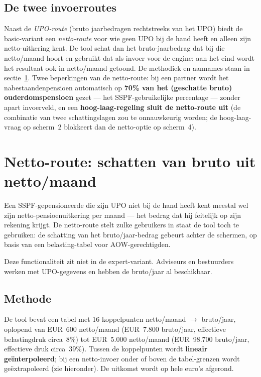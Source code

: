 \documentclass[11pt,a4paper]{article}
\begin{document}
\subsection{De twee invoerroutes}

Naast de \emph{UPO-route} (bruto jaarbedragen rechtstreeks van het UPO) biedt de basic-variant een \emph{netto-route} voor wie geen UPO bij de hand heeft en alleen zijn netto-uitkering kent. De tool schat dan het bruto-jaarbedrag dat bij die netto/maand hoort en gebruikt dat als invoer voor de engine; aan het eind wordt het resultaat ook in netto/maand getoond. De methodiek en aannames staan in sectie~\ref{sec:netto-route}. Twee beperkingen van de netto-route: bij een partner wordt het nabestaandenpensioen automatisch op \textbf{70\% van het (geschatte bruto) ouderdomspensioen} gezet --- het SSPF-gebruikelijke percentage --- zonder apart invoerveld, en een \textbf{hoog-laag-regeling sluit de netto-route uit} (de combinatie van twee schattingslagen zou te onnauwkeurig worden; de hoog-laag-vraag op scherm~2 blokkeert dan de netto-optie op scherm~4).

\section{Netto-route: schatten van bruto uit netto/maand}
\label{sec:netto-route}

Een SSPF-gepensioneerde die zijn UPO niet bij de hand heeft kent meestal wel zijn netto-pensioenuitkering per maand --- het bedrag dat hij feitelijk op zijn rekening krijgt. De netto-route stelt zulke gebruikers in staat de tool toch te gebruiken: de schatting van het bruto/jaar-bedrag gebeurt achter de schermen, op basis van een belasting-tabel voor AOW-gerechtigden.

Deze functionaliteit zit niet in de expert-variant. Adviseurs en bestuurders werken met UPO-gegevens en hebben de bruto/jaar al beschikbaar.

\subsection{Methode}

De tool bevat een tabel met 16 koppelpunten netto/maand $\to$ bruto/jaar, oplopend van \mbox{EUR 600} netto/maand (\mbox{EUR 7.800} bruto/jaar, effectieve belastingdruk circa~$8\%$) tot \mbox{EUR 5.000} netto/maand (\mbox{EUR 98.700} bruto/jaar, effectieve druk circa~$39\%$). Tussen de koppelpunten wordt \textbf{lineair geïnterpoleerd}; bij een netto-invoer onder of boven de tabel-grenzen wordt geëxtrapoleerd (zie hieronder). De uitkomst wordt op hele euro's afgerond.
\end{document}
